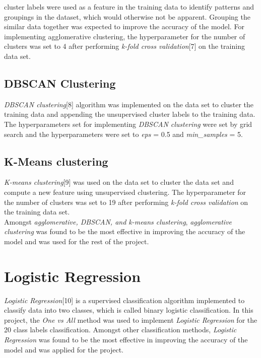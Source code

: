 \documentclass[conference]{IEEEtran}
\begin{document}
    cluster labels were used as a feature in the training data to identify patterns and groupings in the dataset, which would otherwise not be apparent. Grouping the similar data together was expected to improve the accuracy of the model. For implementing agglomerative clustering, the hyperparameter for the number of clusters was set to 4 after performing \textit{k-fold cross validation}[7] on the training data set. 
\subsection{DBSCAN Clustering}
    \textit{DBSCAN clustering}[8] algorithm was implemented on the data set to cluster the training data and appending the unsupervised cluster labels to the training data. The hyperparameters set for implementing \textit{DBSCAN clustering} were set by grid search and the hyperparameters were set to \textit{eps} = 0.5 and \textit{min\_samples} = 5.
\subsection{K-Means clustering}
    \textit{K-means clustering}[9] was used on the data set to cluster the data set and compute a new feature using unsupervised clustering. The hyperparameter for the number of clusters was set to 19 after performing \textit{k-fold cross validation} on the training data set. 
\\ Amongst \textit{agglomerative, DBSCAN, and k-means clustering}, \textit{agglomerative clustering} was found to be the most effective in improving the accuracy of the model and was used for the rest of the project.

\section{Logistic Regression} 
    \textit{Logistic Regression}[10]  is a supervised classification algorithm implemented to classify data into two classes, which is called binary logistic classification. In this project, the \textit{One vs All} method was used to implement \textit{Logistic Regression} for the 20 class labels classification. Amongst other classification methods, \textit{Logistic Regression} was found to be the most effective in improving the accuracy of the model and was applied for the project. 




\end{document}
